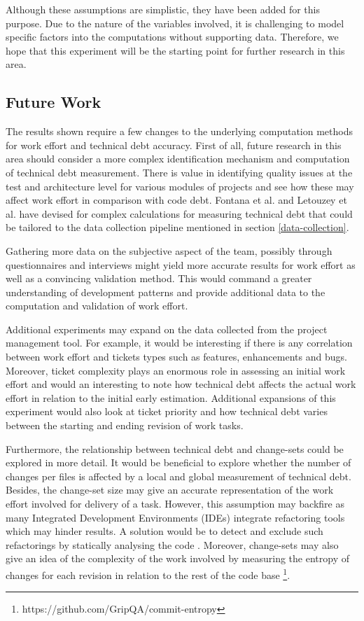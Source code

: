 \documentclass{mpaper}
\begin{document}
Although these assumptions are simplistic, they have been added for this
purpose. Due to the nature of the variables involved, it is challenging to model
specific factors into the computations without supporting data. Therefore, we
hope that this experiment will be the starting point for further research in
this area. 

\subsection{Future Work}
\label{future-work}

The results shown require a few changes to the underlying computation methods
for work effort and technical debt accuracy. First of all, future research in
this area should consider a more complex identification mechanism and
computation of technical debt measurement. There is value in identifying quality
issues at the test and architecture level for various modules of projects and
see how these may affect work effort in comparison with code debt. Fontana et
al. \cite{Fontana2016} and Letouzey et al. \cite{Letouzey2012} have devised for
complex calculations for measuring technical debt that could be tailored to the
data collection pipeline mentioned in section \ref{data-collection}.

Gathering more data on the subjective aspect of the team, possibly through
questionnaires and interviews might yield more accurate results for work effort
as well as a convincing validation method. This would command a greater
understanding of development patterns and provide additional data to the
computation and validation of work effort.

Additional experiments may expand on the data collected from the project
management tool. For example, it would be interesting if there is any
correlation between work effort and tickets types such as features, enhancements
and bugs. Moreover, ticket complexity plays an enormous role in assessing an
initial work effort and would an interesting to note how technical debt affects
the actual work effort in relation to the initial early estimation. Additional
expansions of this experiment would also look at ticket priority and how
technical debt varies between the starting and ending revision of work tasks. 

Furthermore, the relationship between technical debt and change-sets could be
explored in more detail. It would be beneficial to explore whether the number of
changes per files is affected by a local and global measurement of technical
debt. Besides, the change-set size may give an accurate representation of
the work effort involved for delivery of a task. However, this assumption may
backfire as many Integrated Development Environments (IDEs) integrate
refactoring tools which may hinder results. A solution would be to detect and
exclude such refactorings by statically analysing the code \cite{Silva2017}.
Moreover, change-sets may also give an idea of the complexity of the work
involved by measuring the entropy of changes for each revision in relation to
the rest of the code base \footnote{https://github.com/GripQA/commit-entropy}. 
\end{document}
